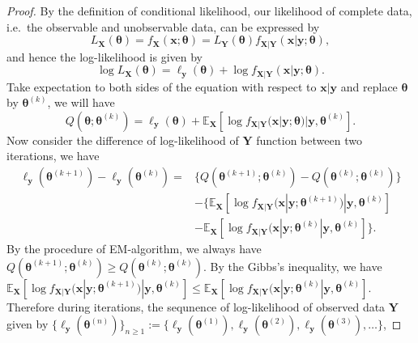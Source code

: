 \documentclass[
  a4paper,
  oneside,
  openany,
  12pt,
  onecolumn,
  twoside]{book}
\theoremstyle{plain}
\theoremstyle{remark}
\begin{document}
\begin{proof}
By the definition of conditional likelihood, our likelihood of complete
data, i.e.~the observable and unobservable data, can be expressed by \[
L_{\boldsymbol{X}}(\boldsymbol{\theta}) = f_{\boldsymbol{X}}(\boldsymbol{x};\boldsymbol{\theta})=L_{\boldsymbol{Y}}(\boldsymbol{\theta})f_{\boldsymbol{X|Y}}(\boldsymbol{x}|\boldsymbol{y};\boldsymbol{\theta}),
\] and hence the log-likelihood is given by \[
\log L_{\boldsymbol{X}}(\boldsymbol{\theta}) = \ell_{\boldsymbol{y}}(\boldsymbol{\theta}) + \log f_{\boldsymbol{X|Y}}(\boldsymbol{x}|\boldsymbol{y};\boldsymbol{\theta}).
\] Take expectation to both sides of the equation with respect to
\(\boldsymbol{x|y}\) and replace \(\boldsymbol{\theta}\) by
\(\boldsymbol{\theta}^{(k)}\), we will have \[
Q(\boldsymbol{\theta};\boldsymbol{\theta}^{(k)}) = \ell_{\boldsymbol{y}}(\boldsymbol{\theta}) + \mathbb{E}_{\boldsymbol{X}}[\log f_{\boldsymbol{X|Y}}(\boldsymbol{x}|\boldsymbol{y};\boldsymbol{\theta})|\boldsymbol{y},\boldsymbol{\theta}^{(k)}].
\] Now consider the difference of log-likelihood of \(\boldsymbol{Y}\)
function between two iterations, we have \[
\begin{align*}
  \ell_{\boldsymbol{y}}(\boldsymbol{\theta}^{(k+1)})-\ell_{\boldsymbol{y}}(\boldsymbol{\theta}^{(k)}) =
  &\{Q(\boldsymbol{\theta}^{(k+1)};\boldsymbol{\theta}^{(k)})-Q(\boldsymbol{\theta}^{(k)};\boldsymbol{\theta}^{(k)})\}\\
  &-\{\mathbb{E}_{\boldsymbol{X}}[\log         f_{\boldsymbol{X|Y}}(\boldsymbol{x}|\boldsymbol{y};\boldsymbol{\theta}^{(k+1)})|\boldsymbol{y},\boldsymbol{\theta}^{(k)}]\\
  &-\mathbb{E}_{\boldsymbol{X}}[\log         f_{\boldsymbol{X|Y}}(\boldsymbol{x}|\boldsymbol{y};\boldsymbol{\theta}^{(k)}|\boldsymbol{y},\boldsymbol{\theta}^{(k)}]\}.
\end{align*}
\] By the procedure of EM-algorithm, we always have
\(Q(\boldsymbol{\theta}^{(k+1)};\boldsymbol{\theta}^{(k)})\geq Q(\boldsymbol{\theta}^{(k)};\boldsymbol{\theta}^{(k)})\).
By the Gibbs's inequality, we have
\(\mathbb{E}_{\boldsymbol{X}}[\log         f_{\boldsymbol{X|Y}}(\boldsymbol{x}|\boldsymbol{y};\boldsymbol{\theta}^{(k+1)})|\boldsymbol{y},\boldsymbol{\theta}^{(k)}] \leq \mathbb{E}_{\boldsymbol{X}}[\log         f_{\boldsymbol{X|Y}}(\boldsymbol{x}|\boldsymbol{y};\boldsymbol{\theta}^{(k)}|\boldsymbol{y},\boldsymbol{\theta}^{(k)}].\)
Therefore during iterations, the sequnence of log-likelihood of observed
data \(\boldsymbol{Y}\) given by
\(\{\ell_{\boldsymbol{y}}(\boldsymbol{\theta}^{(n)})\}_{n\geq 1}:=\{\ell_{\boldsymbol{y}}(\boldsymbol{\theta}^{(1)}),\ell_{\boldsymbol{y}}(\boldsymbol{\theta}^{(2)}),\ell_{\boldsymbol{y}}(\boldsymbol{\theta}^{(3)}),\dots\}\),

\end{proof}
\end{document}
